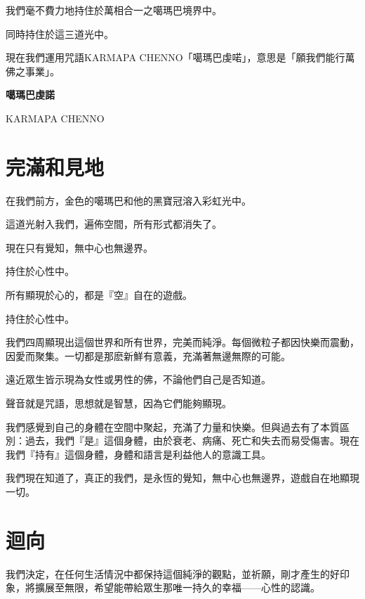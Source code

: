 \documentclass[a6paper,10pt]{ctexbook}
\newcommand{\remark}[1]{\vspace*{2pt} \textsf{#1}\vspace*{2pt}}
\begin{document}
我們毫不費力地持住於萬相合一之噶瑪巴境界中。

\remark{同時持住於這三道光中。}

現在我們運用咒語KARMAPA CHENNO「噶瑪巴虔喏」，意思是「願我們能行萬佛之事業」。

\begin{center}\large\bfseries
噶瑪巴虔諾

KARMAPA CHENNO
\end{center}

\vspace{-4em}
\section*{完滿和見地}

在我們前方，金色的噶瑪巴和他的黑寶冠溶入彩虹光中。

這道光射入我們，遍佈空間，所有形式都消失了。

現在只有覺知，無中心也無邊界。

\remark{持住於心性中。}

所有顯現於心的，都是『空』自在的遊戲。

\remark{持住於心性中。}

我們四周顯現出這個世界和所有世界，完美而純淨。每個微粒子都因快樂而震動，因愛而聚集。一切都是那麽新鮮有意義，充滿著無邊無際的可能。

遠近眾生皆示現為女性或男性的佛，不論他們自己是否知道。

聲音就是咒語，思想就是智慧，因為它們能夠顯現。

我們感覺到自己的身體在空間中聚起，充滿了力量和快樂。但與過去有了本質區別：過去，我們『是』這個身體，由於衰老、病痛、死亡和失去而易受傷害。現在我們『持有』這個身體，身體和語言是利益他人的意識工具。

我們現在知道了，真正的我們，是永恆的覺知，無中心也無邊界，遊戲自在地顯現一切。

\section*{迴向}

我們決定，在任何生活情況中都保持這個純淨的觀點，並祈願，剛才產生的好印象，將擴展至無限，希望能帶給眾生那唯一持久的幸福——心性的認識。
\newpage
\theendnotes
\end{document}
